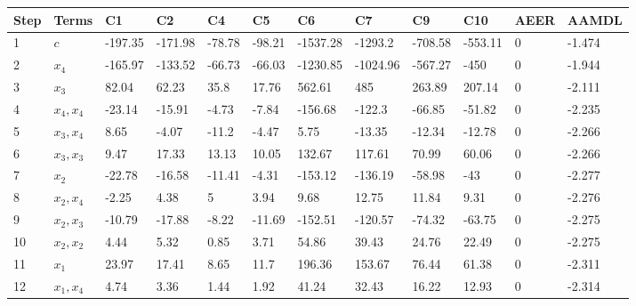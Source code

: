 \begin{tabular}{llllllllllll}
Step & Terms & C1 & C2 & C4 & C5 & C6 & C7 & C9 & C10 & AEER & AAMDL \\ 
\hline 
1 & $c$ & -197.35 & -171.98 & -78.78 & -98.21 & -1537.28 & -1293.2 & -708.58 & -553.11 & 0 & -1.474 \\ 
2 & $x_4$ & -165.97 & -133.52 & -66.73 & -66.03 & -1230.85 & -1024.96 & -567.27 & -450 & 0 & -1.944 \\ 
3 & $x_3$ & 82.04 & 62.23 & 35.8 & 17.76 & 562.61 & 485 & 263.89 & 207.14 & 0 & -2.111 \\ 
4 & $x_4,x_4$ & -23.14 & -15.91 & -4.73 & -7.84 & -156.68 & -122.3 & -66.85 & -51.82 & 0 & -2.235 \\ 
5 & $x_3,x_4$ & 8.65 & -4.07 & -11.2 & -4.47 & 5.75 & -13.35 & -12.34 & -12.78 & 0 & -2.266 \\ 
6 & $x_3,x_3$ & 9.47 & 17.33 & 13.13 & 10.05 & 132.67 & 117.61 & 70.99 & 60.06 & 0 & -2.266 \\ 
7 & $x_2$ & -22.78 & -16.58 & -11.41 & -4.31 & -153.12 & -136.19 & -58.98 & -43 & 0 & -2.277 \\ 
8 & $x_2,x_4$ & -2.25 & 4.38 & 5 & 3.94 & 9.68 & 12.75 & 11.84 & 9.31 & 0 & -2.276 \\ 
9 & $x_2,x_3$ & -10.79 & -17.88 & -8.22 & -11.69 & -152.51 & -120.57 & -74.32 & -63.75 & 0 & -2.275 \\ 
10 & $x_2,x_2$ & 4.44 & 5.32 & 0.85 & 3.71 & 54.86 & 39.43 & 24.76 & 22.49 & 0 & -2.275 \\ 
11 & $x_1$ & 23.97 & 17.41 & 8.65 & 11.7 & 196.36 & 153.67 & 76.44 & 61.38 & 0 & -2.311 \\ 
12 & $x_1,x_4$ & 4.74 & 3.36 & 1.44 & 1.92 & 41.24 & 32.43 & 16.22 & 12.93 & 0 & -2.314 \\ 
\hline 
\end{tabular}
